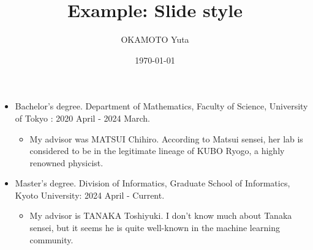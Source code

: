 \documentclass[dvipdfmx,11pt,notheorems]{beamer}
\title{Example: Slide style}
\author{OKAMOTO Yuta}
\institute{Division of Informatics, Graduate School of Informatics, Kyoto University}
\date{\today}
\begin{document}
\begin{frame}
  \titlepage
\end{frame}

\begin{frame}
  \begin{itemize}
    \item Bachelor's degree. Department of Mathematics, Faculty of Science, University of Tokyo : 2020 April - 2024 March.
          \begin{itemize}
            \item My advisor was MATSUI Chihiro. According to Matsui sensei, her lab is considered to be in the legitimate lineage of KUBO Ryogo, a highly renowned physicist.
          \end{itemize}
    \item Master's degree. Division of Informatics, Graduate School of Informatics, Kyoto University: 2024 April - Current.
          \begin{itemize}
            \item My advisor is TANAKA Toshiyuki. I don't know much about Tanaka sensei, but it seems he is quite well-known in the machine learning community.
          \end{itemize}
  \end{itemize}
\end{frame}
\end{document}
